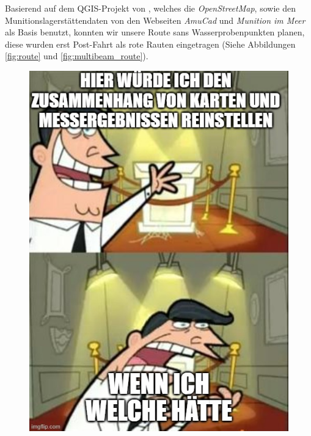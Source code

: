 Basierend auf dem QGIS-Projekt von \jens, welches die \emph{OpenStreetMap}, sowie den Munitionslagerstättendaten von den Webseiten
\emph{AmuCad}\cite{amucad} und \emph{Munition im Meer}\cite{muninmeer}
als Basis benutzt, konnten wir unsere Route sans Wasserprobenpunkten planen, diese wurden erst Post-Fahrt als rote Rauten eingetragen (Siehe Abbildungen \ref{fig:route} und \ref{fig:multibeam_route}).
\begin{figure}[H]
\includegraphics[width=.5\textwidth]{Bilder/QGIS/ifihadany.jpg}
\end{figure}
